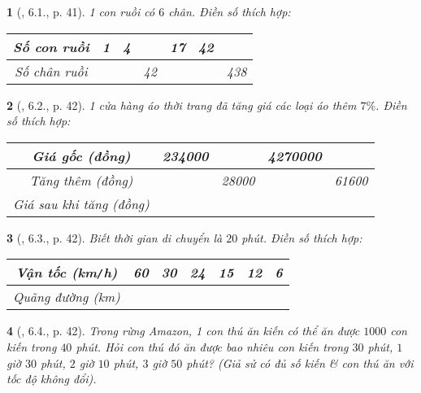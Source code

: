 \documentclass{article}
\newtheorem{baitoan}{}
\begin{document}
\begin{baitoan}[\cite{Binh_boi_duong_Toan_7_tap_1}, 6.1., p. 41]
	1 con ruồi có $6$ chân. Điền số thích hợp:
	\begin{table}[H]
		\centering
		\begin{tabular}{|c|c|c|c|c|c|c|}
			\hline
			Số con ruồi & 1 & 4 &  & 17 & 42 & \\
			\hline
			Số chân ruồi & & & 42 &  &  & 438 \\
			\hline
		\end{tabular}
	\end{table}
\end{baitoan}

\begin{baitoan}[\cite{Binh_boi_duong_Toan_7_tap_1}, 6.2., p. 42]
	1 cửa hàng áo thời trang đã tăng giá các loại áo thêm $7\%$. Điền số thích hợp:
	\begin{table}[H]
		\centering
		\begin{tabular}{|c|c|c|c|c|}
			\hline
			Giá gốc (đồng) & 234000 &  & 4270000 &  \\
			\hline
			Tăng thêm (đồng) &  & 28000 &  & 61600 \\
			\hline
			Giá sau khi tăng (đồng) &  &  &  &  \\
			\hline
		\end{tabular}
	\end{table}
\end{baitoan}

\begin{baitoan}[\cite{Binh_boi_duong_Toan_7_tap_1}, 6.3., p. 42]
	Biết thời gian di chuyển là $20$ phút. Điền số thích hợp:
	\begin{table}[H]
		\centering
		\begin{tabular}{|c|c|c|c|c|c|c|}
			\hline
			Vận tốc (km{\tt/}h) & 60 & 30 & 24 & 15 & 12 & 6 \\
			\hline
			Quãng đường (km) &  &  &  &  &  &  \\
			\hline
		\end{tabular}
	\end{table}
\end{baitoan}

\begin{baitoan}[\cite{Binh_boi_duong_Toan_7_tap_1}, 6.4., p. 42]
	Trong rừng Amazon, 1 con thú ăn kiến có thể ăn được $1000$ con kiến trong $40$ phút. Hỏi con thú đó ăn được bao nhiêu con kiến trong $30$ phút, $1$ giờ $30$ phút, $2$ giờ $10$ phút, $3$ giờ $50$ phút? (Giả sử có đủ số kiến \& con thú ăn với tốc độ không đổi).
\end{baitoan}
\end{document}
